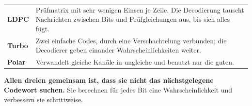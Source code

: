 \begin{merksatz}
\begin{center}
\begin{minipage}{0.88\textwidth}
\end{minipage}
\end{center}
\end{merksatz}

\begin{merksatz}
\begin{center}
{\small
\renewcommand{\arraystretch}{1.5}
\begin{tabular}{@{}P{2.4cm}P{6.2cm}@{}}
\toprule
\textbf{LDPC} & Prüfmatrix mit sehr wenigen Einsen je Zeile. Die Decodierung tauscht Nachrichten zwischen Bits und Prüfgleichungen aus, bis sich alles fügt.\\
\textbf{Turbo} & Zwei einfache Codes, durch eine Verschachtelung verbunden; die Decodierer geben einander Wahrscheinlichkeiten weiter.\\
\textbf{Polar} & Verwandelt gleiche Kanäle in ungleiche und benutzt nur die guten.\\
\bottomrule
\end{tabular}}
\end{center}

\begin{center}
\begin{minipage}{0.9\textwidth}
\textbf{Allen dreien gemeinsam ist, dass sie nicht das nächstgelegene Codewort suchen.} Sie berechnen für jedes Bit eine Wahrscheinlichkeit und verbessern sie schrittweise.
\end{minipage}
\end{center}

\begin{center}
\begin{minipage}{0.88\textwidth}
\end{minipage}
\end{center}
\end{merksatz}

